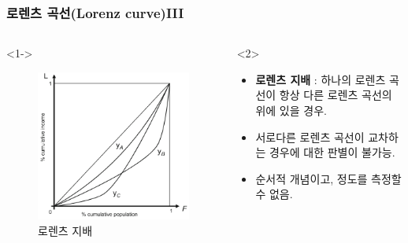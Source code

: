 \documentclass[aspectratio=169,xcolor=dvipsnames,]{beamer}
\begin{document}
\begin{frame}
\frametitle{로렌츠 곡선(Lorenz curve)III}
    \begin{columns}
        \begin{column}{.5\textwidth}<1->
            \begin{figure}
                \centering
                \includegraphics[width=.78\textwidth]{pic/lorenzd.png}
                \caption{로렌츠 지배}
            \end{figure}
        \end{column}
        \begin{column}{.5\textwidth}<2>
            \begin{itemize}
                \item {\bf 로렌츠 지배} : 하나의 로렌츠 곡선이 항상 다른 로렌츠 곡선의 위에 있을 경우.
                \item 서로다른 로렌츠 곡선이 교차하는 경우에 대한 판별이 불가능.
                \item 순서적 개념이고, 정도를 측정할 수 없음.
            \end{itemize}
        \end{column}
    \end{columns}
\end{frame}
\end{document}
